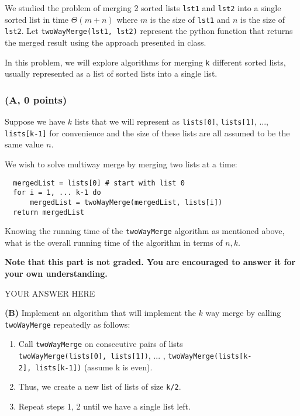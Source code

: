 \documentclass[
]{article}
\providecommand{\tightlist}{%
  \setlength{\itemsep}{0pt}\setlength{\parskip}{0pt}}
\begin{document}
We studied the problem of merging 2 sorted lists \texttt{lst1} and
\texttt{lst2} into a single sorted list in time \(\Theta(m + n)\) where
\(m\) is the size of \texttt{lst1} and \(n\) is the size of
\texttt{lst2}. Let \texttt{twoWayMerge(lst1,\ lst2)} represent the
python function that returns the merged result using the approach
presented in class.

In this problem, we will explore algorithms for merging \texttt{k}
different sorted lists, usually represented as a list of sorted lists
into a single list.

\hypertarget{a-0-points}{%
\subsubsection{(A, 0 points)}\label{a-0-points}}

Suppose we have \(k\) lists that we will represent as
\texttt{lists{[}0{]}}, \texttt{lists{[}1{]}}, ...,
\texttt{lists{[}k-1{]}} for convenience and the size of these lists are
all assumed to be the same value \(n\).

We wish to solve multiway merge by merging two lists at a time:

\begin{verbatim}
  mergedList = lists[0] # start with list 0
  for i = 1, ... k-1 do
      mergedList = twoWayMerge(mergedList, lists[i])
  return mergedList
\end{verbatim}

Knowing the running time of the \texttt{twoWayMerge} algorithm as
mentioned above, what is the overall running time of the algorithm in
terms of \(n, k\).

\textbf{Note that this part is not graded. You are encouraged to answer
it for your own understanding.}

YOUR ANSWER HERE

\textbf{(B)} Implement an algorithm that will implement the \(k\) way
merge by calling \texttt{twoWayMerge} repeatedly as follows:

\begin{enumerate}
\tightlist
\item
  Call \texttt{twoWayMerge} on consecutive pairs of lists
  \texttt{twoWayMerge(lists{[}0{]},\ lists{[}1{]})}, ... ,
  \texttt{twoWayMerge(lists{[}k-2{]},\ lists{[}k-1{]})} (assume k is
  even).
\item
  Thus, we create a new list of lists of size \texttt{k/2}.
\item
  Repeat steps 1, 2 until we have a single list left.
\end{enumerate}
\end{document}
